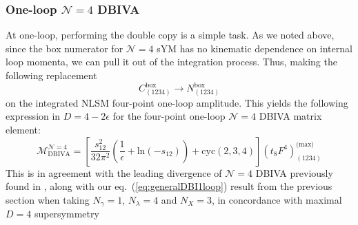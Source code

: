 \documentclass[11pt,letter]{article}
\def\eqn#1{eq.~(\ref{#1})}
\begin{document}
\subsubsection{One-loop $\mathcal{N}=4$ DBIVA} \label{sec:DBIvDC1loop}
At one-loop, performing the double copy is a simple task. As we noted above, since the box numerator for $\mathcal{N}=4$ sYM has no kinematic dependence on internal loop momenta, we can pull it out of the integration process. Thus, making the following replacement 
\begin{equation}
C^{\text{box}}_{(1234)} \rightarrow N^{\text{box}}_{(1234)}
\end{equation}
on the integrated NLSM four-point one-loop amplitude. This yields the following expression in $D=4-2\epsilon$ for the four-point one-loop $\mathcal{N}=4$ DBIVA matrix element:
\begin{equation}
\mathcal{M}^{\mathcal{N}=4}_{\text{DBIVA}} = \left[\frac{s_{12}^2}{32\pi^2}\left(\frac{1}{\epsilon} +\text{ln}(-s_{12})\right)+\text{cyc}(2,3,4)\right](t_8F^4)^{\text{(max)}}_{(1234)} 
\end{equation}
This is in agreement with the leading divergence of $\mathcal{N}=4$ DBIVA previously found in \cite{Elvang:2020kuj}, along with our \eqn{eq:generalDBI1loop} result from the previous section when taking $N_\gamma =1$, $N_\lambda=4$ and $N_X=3$, in concordance with maximal $D=4$ supersymmetry 
\end{document}

